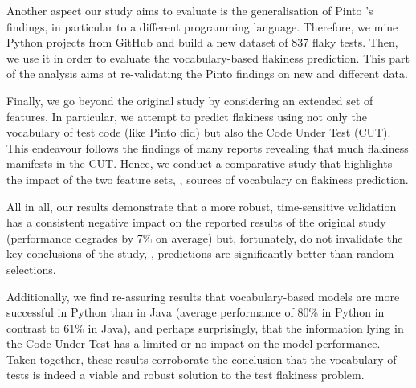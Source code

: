 Another aspect our study aims to evaluate is the generalisation of Pinto \etal's findings, in particular to a different programming language. Therefore, we mine Python projects from GitHub and build a new dataset of 837 flaky tests. Then, we use it in order to evaluate the vocabulary-based flakiness prediction. This part of the analysis aims at re-validating the Pinto \etal findings on new and different data. 

Finally, we go beyond the original study by considering an extended set of features. In particular, we attempt to predict flakiness using not only the vocabulary of test code (like Pinto \etal did) but also the Code Under Test (CUT). This endeavour follows the findings of many reports\cite{Luo2014,Thorve2018,Lam2020b} revealing that much flakiness manifests in the CUT. Hence, we conduct a comparative study that highlights the impact of the two feature sets, \ie, sources of vocabulary on flakiness prediction.


All in all, our results demonstrate that a more robust, time-sensitive validation has a consistent negative impact on the reported results of the original study (performance degrades by 7\% on average) but, fortunately, do not invalidate the key conclusions of the study, \ie, predictions are significantly better than random selections. 

Additionally, we find re-assuring results that vocabulary-based models are more successful in Python than in Java (average performance of 80\% in Python in contrast to 61\% in Java), and perhaps surprisingly, that the information lying in the Code Under Test has a limited or no impact on the model performance. Taken together, these results corroborate the conclusion that the vocabulary of tests is indeed a viable and robust solution to the test flakiness problem.    




